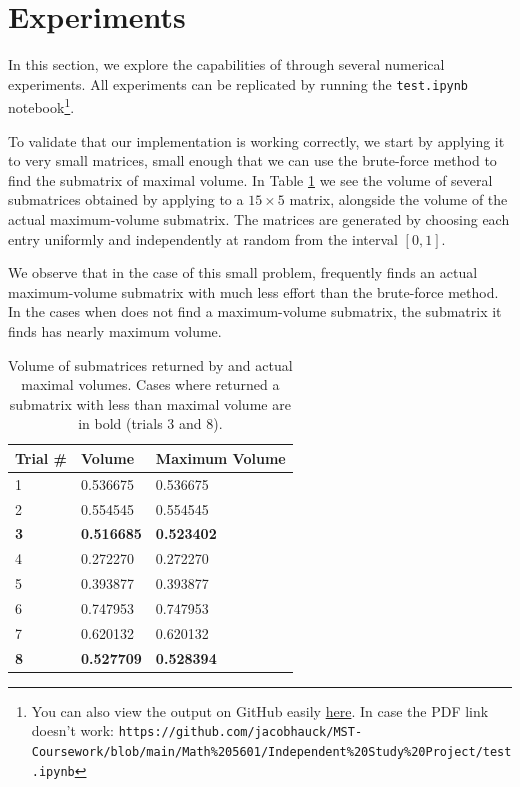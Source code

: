 \documentclass{article}
\begin{document}
	\section{Experiments}
	
	In this section, we explore the capabilities of \maxvol{} through several numerical experiments. All experiments can be replicated by running the \texttt{test.ipynb} notebook\footnote{You can also view the output on GitHub easily \href{https://github.com/jacobhauck/MST-Coursework/blob/main/Math\%205601/Independent\%20Study\%20Project/test.ipynb}{here}. In case the PDF link doesn't work: \texttt{https://github.com/jacobhauck/MST-Coursework/blob/main/Math\%205601/Independent\%20Study\%20Project/test.ipynb}}.
	
	
	To validate that our implementation is working correctly, we start by applying it to very small matrices, small enough that we can use the brute-force method to find the submatrix of maximal volume. In Table \ref{table:validation} we see the volume of several submatrices obtained by applying \maxvol{} to a $15\times 5$ matrix, alongside the volume of the actual maximum-volume submatrix. The matrices are generated by choosing each entry uniformly and independently at random from the interval $[0,1]$.
	
	We observe that in the case of this small problem, \maxvol{} frequently finds an actual maximum-volume submatrix with much less effort than the brute-force method. In the cases when \maxvol{} does not find a maximum-volume submatrix, the submatrix it finds has nearly maximum volume.
	
	\begin{table}[h]
		\centering
		\begin{tabular}{@{}lll@{}}
			\toprule
			Trial \# & \maxvol{} Volume & Maximum Volume \\
			\midrule
			1 & 0.536675 & 0.536675\\
			2 & 0.554545 & 0.554545\\
			\bf 3 & \bf 0.516685 & \bf 0.523402\\
			4 & 0.272270 & 0.272270\\
			5 & 0.393877 & 0.393877\\
			6 & 0.747953 & 0.747953\\
			7 & 0.620132 & 0.620132\\
			\bf 8 & \bf 0.527709 & \bf 0.528394\\
			\bottomrule
		\end{tabular}
		\caption{Volume of submatrices returned by \maxvol{} and actual maximal volumes. Cases where \maxvol{} returned a submatrix with less than maximal volume are in bold (trials 3 and 8).}
		\label{table:validation}
	\end{table}
	
\end{document}
